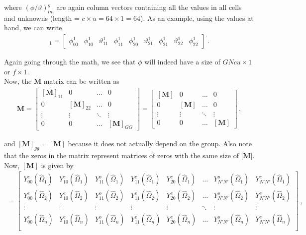 \documentclass[10pt]{article}
\begin{document}
where $(\phi/\vartheta)_{lm}^g$ are again column vectors containing all the values in all cells and unknowns (length = $c \times u = 64 \times 1 = 64$). As an example, using the values at hand, we can write
%
\begin{align*}
[\phi]_1 =
\begin{bmatrix}
    \phi_{00}^1 & \phi_{10}^1 & \vartheta_{11}^1 & \phi_{11}^1 & \phi_{20}^1 & \vartheta_{21}^1 & \phi_{21}^1 & \vartheta_{22}^1 & \phi_{22}^1
\end{bmatrix} ^ ,.
\end{align*}

Again going through the math, we see that $\phi$ will indeed have a size of $GNcu \times 1$ or $f \times 1$.\\

Now, the $\textbf{M}$ matrix can be written as
%
\begin{align*}
\textbf{M} = 
\begin{bmatrix}
    [\textbf{M}]_{11} & 0 & \dots & 0  \\
    0 & [\textbf{M}]_{22} & \dots & 0  \\
    \vdots & \vdots & \ddots & \vdots \\
    0 & 0 & \dots & [\textbf{M}]_{GG}
\end{bmatrix}
=
\begin{bmatrix}
    [\textbf{M}] & 0 & \dots & 0  \\
    0 & [\textbf{M}] & \dots & 0  \\
    \vdots & \vdots & \ddots & \vdots \\
    0 & 0 & \dots & [\textbf{M}]
\end{bmatrix}\,,
\end{align*}

and $[\textbf{M}]_{gg} = [\textbf{M}]$ because it does not actually depend on the group. Also note that the zeros in the matrix represent matrices of zeros with the same size of [$\textbf{M}$]. Now, $[\textbf{M}]$ is given by
%
\begin{align*}
[\textbf{M}] = 
\begin{bmatrix}
   Y_{00}^e(\hat{\Omega}_1) & Y_{10}^e(\hat{\Omega}_1) & Y_{11}^o(\hat{\Omega}_1) & Y_{11}^e(\hat{\Omega}_1) & Y_{20}^e(\hat{\Omega}_1) & \dots & Y_{N'N'}^o(\hat{\Omega}_1) & Y_{N'N'}^e(\hat{\Omega}_1)  \\
      Y_{00}^e(\hat{\Omega}_2) & Y_{10}^e(\hat{\Omega}_2) & Y_{11}^o(\hat{\Omega}_2) & Y_{11}^e(\hat{\Omega}_2) & Y_{20}^e(\hat{\Omega}_2) & \dots & Y_{N'N'}^o(\hat{\Omega}_2) & Y_{N'N'}^e(\hat{\Omega}_2)  \\
      \vdots & \vdots & \vdots & \vdots & \vdots & \ddots &  \vdots & \vdots \\
         Y_{00}^e(\hat{\Omega}_n) & Y_{10}^e(\hat{\Omega}_n) & Y_{11}^o(\hat{\Omega}_n) & Y_{11}^e(\hat{\Omega}_n) & Y_{20}^e(\hat{\Omega}_n) & \dots & Y_{N'N'}^o(\hat{\Omega}_n) & Y_{N'N'}^e(\hat{\Omega}_n)  \\
\end{bmatrix}\,,
\end{align*}
\end{document}
